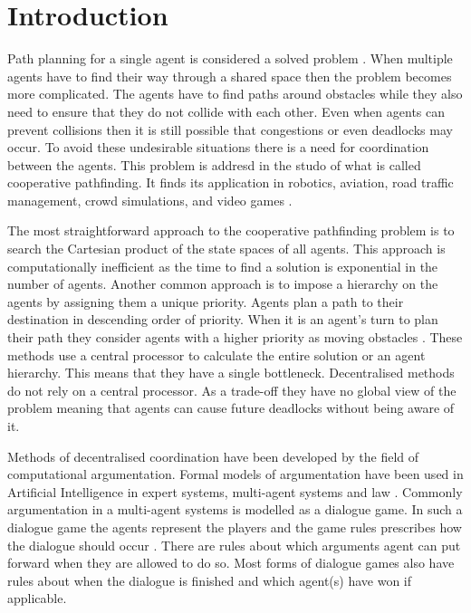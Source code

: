 \section{Introduction}\label{sec:intro}
Path planning for a single agent is considered a solved problem 
\citep{sharon2013}. When multiple agents have to find their way through a 
shared 
space then the problem becomes more complicated. The agents have to find paths 
around obstacles while they also need to ensure that they do not collide with 
each other. Even when agents can prevent collisions then it is still possible 
that congestions or even deadlocks may occur. To avoid these undesirable 
situations there is a need for coordination between the agents. This problem is 
addresd in the studo of what is called cooperative pathfinding. It finds its 
application in robotics, aviation, road traffic management, crowd simulations, 
and video games \citep{standley2011}.

The most straightforward approach to the cooperative pathfinding problem
is to search the Cartesian product of the state spaces of all agents. This
approach is computationally inefficient \citep{sharon2013,hopcroft1984} as the 
time to find a solution is exponential in the number of agents. Another common 
approach is to impose a hierarchy on the agents by assigning them a unique 
priority. Agents plan a path to their destination in descending order of 
priority. When it is an agent's turn to plan their path they consider agents 
with a higher priority as moving obstacles \citep{bennewitz2002}. These methods 
use a central processor to calculate the entire solution or an agent hierarchy. 
This means that they have a single bottleneck. Decentralised methods do not 
rely on a central processor. As a trade-off they have no global view of the 
problem meaning that agents can cause future deadlocks without being aware of 
it.

Methods of decentralised coordination have been developed by the field of
computational argumentation. Formal models of argumentation have been used in 
Artificial Intelligence in expert systems, multi-agent systems and law
\citep{vaneemeren2014}. Commonly argumentation in a multi-agent systems is 
modelled as a dialogue game. In such a dialogue game the agents represent the 
players and the game rules prescribes how the dialogue should occur 
\citep{walton1995}. There are rules about which arguments agent can put forward 
when they are allowed to do so. Most forms of dialogue games also have rules 
about when the dialogue is finished and which agent(s) have won if applicable.

